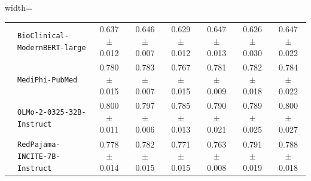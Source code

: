 \begin{adjustbox}{width=\textwidth}
\begin{tabular}{c lcccccc}
& \texttt{BioClinical-ModernBERT-large}  & 0.637 $\pm$ 0.012 & 0.646 $\pm$ 0.007 & 0.629 $\pm$ 0.012 & 0.647 $\pm$ 0.013 & 0.626 $\pm$ 0.030 & 0.647 $\pm$ 0.022 \\
& \texttt{MediPhi-PubMed}                & 0.780 $\pm$ 0.015 & 0.783 $\pm$ 0.007 & 0.767 $\pm$ 0.015 & 0.781 $\pm$ 0.009 & 0.782 $\pm$ 0.018 & 0.784 $\pm$ 0.022 \\
& \texttt{OLMo-2-0325-32B-Instruct}      & 0.800 $\pm$ 0.011 & 0.797 $\pm$ 0.006 & 0.785 $\pm$ 0.013 & 0.790 $\pm$ 0.021 & 0.789 $\pm$ 0.025 & 0.800 $\pm$ 0.027 \\
& \texttt{RedPajama-INCITE-7B-Instruct}  & 0.778 $\pm$ 0.014 & 0.782 $\pm$ 0.015 & 0.771 $\pm$ 0.015 & 0.763 $\pm$ 0.008 & 0.791 $\pm$ 0.019 & 0.788 $\pm$ 0.018 \\
\bottomrule
\end{tabular}
\end{adjustbox}
